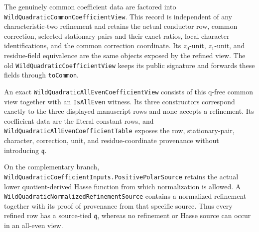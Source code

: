 \begin{definition}
The genuinely common coefficient data are factored into
\texttt{WildQuadraticCommonCoefficientView}.  This record is independent of
any characteristic-two refinement and retains the actual conductor row,
common correction, selected stationary pairs and their exact ratios, local
character identifications, and the common correction coordinate.  Its
\(z_0\)-unit, \(z_1\)-unit, and residue-field equivalence are the same
objects exposed by the refined view.  The old
\texttt{WildQuadraticCoefficientView} keeps its public signature and
forwards these fields through \texttt{toCommon}.

An exact \texttt{WildQuadraticAllEvenCoefficientView} consists of this
q-free common view together with an \texttt{IsAllEven} witness.  Its three
constructors correspond exactly to the three displayed manuscript rows and
none accepts a refinement.  Its coefficient data are the literal constant
rows, and \texttt{WildQuadraticAllEvenCoefficientTable} exposes the row,
stationary-pair, character, correction, unit, and residue-coordinate
provenance without introducing \(\mathfrak q\).

On the complementary branch,
\texttt{WildQuadraticCoefficientInputs.PositivePolarSource} retains the
actual lower quotient-derived Hasse function from which normalization is
allowed.  A \texttt{WildQuadraticNormalizedRefinementSource} contains a
normalized refinement together with its proof of provenance from that
specific source.  Thus every refined row has a source-tied \(\mathfrak q\),
whereas no refinement or Hasse source can occur in an all-even view.


\end{definition}
